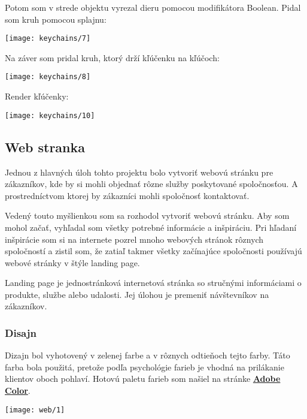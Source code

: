         Potom som v strede objektu vyrezal dieru pomocou modifikátora Boolean. Pidal som kruh pomocou splajnu: \\
        \begin{center}
          \texttt{[image: keychains/7]}
        \end{center}

        Na záver som pridal kruh, ktorý drží kľúčenku na kľúčoch: \\
        \begin{center}
          \texttt{[image: keychains/8]}
        \end{center}

        Render kľúčenky: \\
        \begin{center}
          \texttt{[image: keychains/10]}
        \end{center}

      \subsection{Web stranka}
      Jednou z hlavných úloh tohto projektu bolo vytvoriť webovú stránku pre zákazníkov, kde by si mohli objednať rôzne služby poskytované spoločnosťou. A prostredníctvom ktorej by zákazníci mohli spoločnosť kontaktovať.

      Vedený touto myšlienkou som sa rozhodol vytvoriť webovú stránku. Aby som mohol začať, vyhľadal som všetky potrebné informácie a inšpiráciu. Pri hľadaní inšpirácie som si na internete pozrel mnoho webových stránok rôznych spoločností a zistil som, že zatiaľ takmer všetky začínajúce spoločnosti používajú webové stránky v štýle landing page.

      Landing page je jednostránková internetová stránka so stručnými informáciami o produkte, službe alebo udalosti. Jej úlohou je premeniť návštevníkov na zákazníkov.
 
      \subsubsection{Disajn}
      Dizajn bol vyhotovený v zelenej farbe a v rôznych odtieňoch tejto farby. Táto farba bola použitá, pretože podľa psychológie farieb je vhodná na prilákanie klientov oboch pohlaví. Hotovú paletu farieb som našiel na stránke \textbf{\href{https://color.adobe.com/ru/}{Adobe Color}}.

      \begin{center}
        \texttt{[image: web/1]}
      \end{center}

